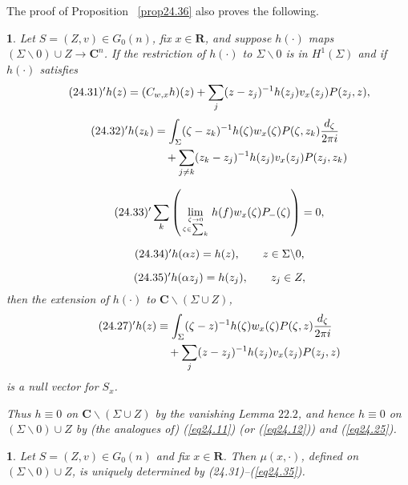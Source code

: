 \documentclass{surv-l}
\theoremstyle{plain}
\newtheorem{cor}[theorem]{\sc{Corollary}}
\newtheorem{prop}[theorem]{\sc{Proposition}}
\theoremstyle{definition}
\numberwithin{equation}{chapter}
\begin{document}
The proof of Proposition ~\ref{prop24.36} also proves the following.
\setcounter{theorem}{37}
\begin{prop}\label{prop24.38}
Let $S=(Z, v)\in G_{0}(n)$, fix $x\in \mathbf{R}$, and suppose $h(\cdot)$ maps $(\Sigma\backslash 0)\cup Z\rightarrow \mathbf{C}^{n}$. If the restriction of $h(\cdot)$ to $\Sigma\backslash 0$ is in $H^{1}(\Sigma)$ and if $h(\cdot)$ satisfies
\begin{equation*}
\tag*{$(24.31)^{\prime}$} h(z)=(C_{w,x}h)(z)+\sum_{j}(z-z_{j})^{-1}h(z_{j})v_{x}(z_{j})P(z_{j},z),
\end{equation*}
\begin{align*}
\tag*{$(24.32)^{\prime}$} h(z_{k})&=\int_{\Sigma}(\zeta-z_{k})^{-1}h(\zeta)w_{x}(\zeta)P(\zeta, z_{k})\frac{d_{\zeta}}{2\pi i}\\
&\quad+\sum_{j\neq k}(z_{k}-z_{j})^{-1}h(z_{j})v_{x}(z_{j})P(z_{j}, z_{k})\nonumber
\end{align*}

\begin{equation*}
\tag*{$(24.33)^{\prime}$} \sum_{k}\left(\lim_{{\zeta\rightarrow 0}\atop{\zeta \in \sum_{k}}} h(f)w_{x}(\zeta)P_{-}(\zeta)\right)=0,
\end{equation*}

\begin{equation*}
\tag*{$(24.34)^{\prime}$}  h(\alpha z)=h(z),\qquad z\in\Sigma\backslash 0,
\end{equation*}

\begin{equation*}
\tag*{$(24.35)^{\prime}$}  h(\alpha z_{j})=h(z_{j}),\qquad z_{j}\in Z,
\end{equation*}
then the extension of $h(\cdot)$ to $\mathbf{C}\backslash (\Sigma\cup Z)$,
\begin{align*}
\tag*{$(24.27)^{\prime}$}   h(z)& \equiv\int_{\Sigma}(\zeta -z)^{-1}h(\zeta)w_{x}(\zeta)P(\zeta,z)\frac{d_{\zeta}}{2\pi i}\\
& \quad +\sum_{j}(z-z_{j})^{-1}h(z_{j})v_{x}(z_{j})P(z_{j}, z) \nonumber
\end{align*}
is a null vector for $S_{x}$.

Thus $h\equiv 0$ on $\mathbf{C}\backslash (\Sigma\cup Z)$ by the
vanishing Lemma $22.2$, and hence $h\equiv 0$ on $(\Sigma\backslash
0)\cup Z$ by (the analogues of) \emph{(\ref{eq24.11})} \emph{(or
(\ref{eq24.12}))} and \emph{(\ref{eq24.25})}.
\end{prop}
\setcounter{theorem}{38}
\begin{cor}\label{coro24.39}
Let $S=(Z, v)\in G_{0}(n)$ and fix $x\in \mathbf{R}$. Then $\mu(x,
\cdot)$, defined on $(\Sigma\backslash 0)\cup Z$, is uniquely
determined by \emph{(24.31)}--\emph{(\ref{eq24.35})}.
\end{cor}
\end{document}
